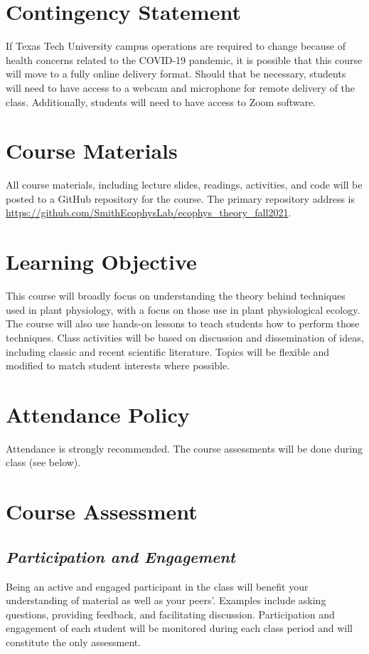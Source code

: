 \documentclass[12pt, notitlepage]{article}   	%
\begin{document}
{\section{Contingency Statement}
If Texas Tech University campus operations are required to change because of health 
concerns related to the COVID-19 pandemic, it is possible that this course will move to 
a fully online delivery format. Should that be necessary, students will need to have 
access to a webcam and microphone for remote delivery of the class. Additionally, students 
will need to have access to Zoom software.

\section{Course Materials}
All course materials, including lecture slides, readings, activities, and code 
will be posted to a GitHub repository for the course.
The primary repository address is
\url{https://github.com/SmithEcophysLab/ecophys_theory_fall2021}.

\section{Learning Objective}
This course will broadly focus on understanding the theory behind techniques
used in plant physiology, with a focus on those use in plant physiological ecology. 
The course will also use hands-on lessons to teach students how to perform those
techniques.
Class activities will be based on discussion and dissemination of ideas, 
including classic and recent scientific literature. 
Topics will be flexible and modified to match student interests where possible.

\section{Attendance Policy}
Attendance is strongly recommended. 
The course assessments will be done during class (see below).

\section{Course Assessment}
\subsection{\textit{Participation and Engagement}}
Being an active and engaged participant in the class will benefit your understanding
of material as well as your peers'. Examples include asking questions, providing feedback,
and facilitating discussion. Participation and engagement of each student will be monitored
during each class period and will constitute the only assessment.

}
\end{document}

